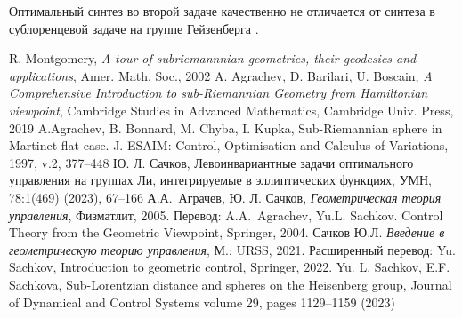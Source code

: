 Оптимальный синтез во второй задаче качественно не отличается от синтеза в сублоренцевой задаче на группе Гейзенберга    \cite{sl_heis}.


\begin{thebibliography}{9} %
R. Montgomery, {\em A tour of subriemannnian geometries, their geodesics and applications}, Amer. Math. Soc., 2002
A. Agrachev, D. Barilari, U. Boscain, {\em A Comprehensive Introduction to
sub-Riemannian Geometry from Hamiltonian viewpoint}, Cambridge Studies in Advanced Mathematics, Cambridge Univ. Press, 2019
A.Agrachev, B. Bonnard, M. Chyba, I. Kupka,
Sub-Riemannian sphere in Martinet flat case. J. ESAIM: Control, Optimisation and Calculus of Variations, 1997, v.2,
377--448 
Ю. Л. Сачков, Левоинвариантные задачи оптимального управления на группах Ли, интегрируемые в эллиптических функциях,  УМН, 78:1(469) (2023),  67--166
А.А.~Аграчев, Ю. Л. Сачков,  
{\em Геометрическая теория управления},
Физматлит, 2005.
Перевод: A.A.~Agrachev, Yu.L. Sachkov. Control Theory from the Geometric Viewpoint,
Springer, 2004.
Сачков Ю.Л. {\em Введение в геометрическую теорию управления}, М.: URSS, 2021.
Расширенный перевод:
Yu. Sachkov, Introduction to geometric control, Springer, 2022.
 	Yu. L. Sachkov, E.F. Sachkova, Sub-Lorentzian distance and spheres on the Heisenberg group, Journal of Dynamical and Control Systems volume 29, pages 1129–1159 (2023)
\end{thebibliography}




%


